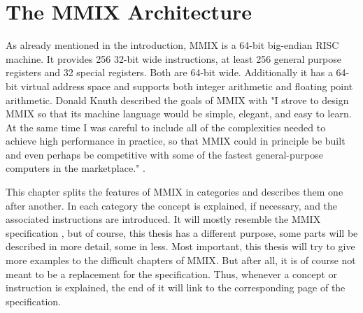\chapter{The MMIX Architecture}
\label{ch:mmix-arch}

As already mentioned in the introduction, MMIX is a 64-bit big-endian \gls{RISC} machine. It provides 256 32-bit wide instructions, at least 256 general purpose registers and 32 special registers. Both are 64-bit wide. Additionally it has a 64-bit virtual address space and supports both integer arithmetic and floating point arithmetic. \gls{Donald Knuth} described the goals of MMIX with "I strove to design MMIX so that its machine language would be simple, elegant, and easy to learn. At the same time I was careful to include all of the complexities needed to achieve high performance in practice, so that MMIX could in principle be built and even perhaps be competitive with some of the fastest general-purpose computers in the marketplace." \citep[pg. v]{mmix-ware-book}.

This chapter splits the features of MMIX in categories and describes them one after another. In each category the concept is explained, if necessary, and the associated instructions are introduced. It will mostly resemble the MMIX specification \citep{mmix-doc}, but of course, this thesis has a different purpose, \ie some parts will be described in more detail, some in less. Most important, this thesis will try to give more examples to the difficult chapters of MMIX. But after all, it is of course not meant to be a replacement for the specification. Thus, whenever a concept or instruction is explained, the end of it will link to the corresponding page of the specification.












